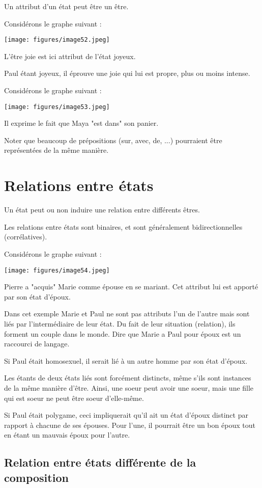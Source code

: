 \documentclass[a4paper, 12pt, openright, french]{book}
\begin{document}
Un attribut d'un état peut être un être.

Considérons le graphe suivant :

\texttt{[image: figures/image52.jpeg]}

L'être joie est ici attribut de l'état
joyeux.

Paul étant joyeux, il éprouve une joie qui lui est propre, plus ou moins
intense.

Considérons le graphe suivant :

\texttt{[image: figures/image53.jpeg]}

Il exprime le fait que Maya "est dans" son panier.

Noter que beaucoup de prépositions (sur, avec, de, ...) pourraient être
représentées de la même manière.



\newpage
\section{Relations entre états}

Un état peut ou non induire une relation entre différents êtres.

Les relations entre états sont binaires, et sont généralement
bidirectionnelles (corrélatives).

Considérons le graphe suivant :

\texttt{[image: figures/image54.jpeg]}

Pierre a "acquis" Marie comme épouse en se mariant. Cet attribut lui est
apporté par son état d'époux.

Dans cet exemple Marie et Paul ne sont pas attributs
l'un de l'autre mais sont liés par
l'intermédiaire de leur état. Du fait de leur situation
(relation), ils forment un couple dans le monde. Dire que Marie a Paul
pour époux est un raccourci de langage.

Si Paul était homosexuel, il serait lié à un autre homme par son état
d'époux.

Les étants de deux états liés sont forcément distincts, même
s'ils sont instances de la même manière
d'être. Ainsi, une soeur peut avoir une soeur, mais une
fille qui est soeur ne peut être soeur d'elle-même.

Si Paul était polygame, ceci impliquerait qu'il ait un
état d'époux distinct par rapport à chacune de ses
épouses. Pour l'une, il pourrait être un bon époux tout
en étant un mauvais époux pour l'autre.

\newpage
\subsection{Relation entre états différente de la composition}
\end{document}
